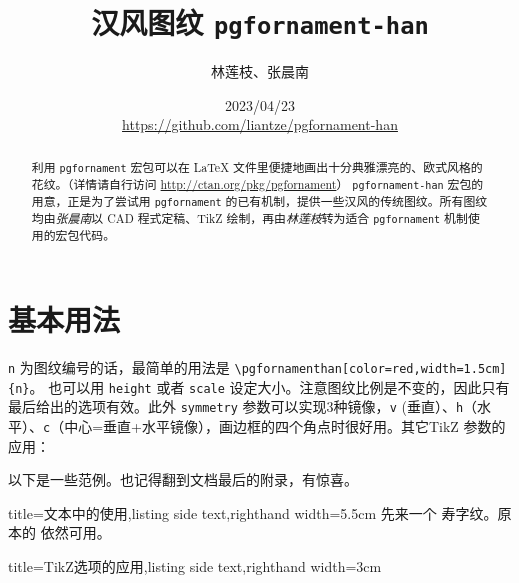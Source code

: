 \documentclass[fontset=fandol]{ctexart}
\title{汉风图纹 \texttt{pgfornament-han}}
\author{林莲枝、张晨南}
\date{2023/04/23\\\url{https://github.com/liantze/pgfornament-han}}
\newcommand{\latexinline}[1]{\lstinline|#1|}
\begin{document}
\maketitle

\begin{abstract}
利用 \texttt{pgfornament} 宏包可以在 \LaTeX{} 文件里便捷地画出十分典雅漂亮的、欧式风格的花纹。（详情请自行访问 \url{http://ctan.org/pkg/pgfornament}）
 \texttt{pgfornament-han} 宏包的用意，正是为了尝试用 \texttt{pgfornament} 的已有机制，提供一些汉风的传统图纹。所有图纹均由\emph{张晨南}以 CAD 程式定稿、TikZ 绘制，再由\emph{林莲枝}转为适合 \texttt{pgfornament} 机制使用的宏包代码。
\end{abstract}

\part{基本用法}

\texttt{n} 为图纹编号的话，最简单的用法是 \latexinline{\pgfornamenthan[color=red,width=1.5cm]{n}}。
也可以用 \texttt{height} 或者 \texttt{scale} 设定大小。注意图纹比例是不变的，因此只有最后给出的选项有效。此外 \texttt{symmetry} 参数可以实现3种镜像，\texttt{v} (垂直）、\texttt{h}（水平）、\texttt{c}（中心=垂直+水平镜像），画边框的四个角点时很好用。其它TikZ 参数的应用：

\begin{latexcode}
\end{latexcode}

以下是一些范例。也记得翻到文档最后的附录，有惊喜。

\bigskip

\begin{tcblisting}{title={文本中的使用},listing side text,righthand width=5.5cm}
先来一个 
寿字纹。原本的  依然可用。
\end{tcblisting}

\enlargethispage{\baselineskip}


\begin{tcblisting}{title={TikZ选项的应用},listing side text,righthand width=3cm}
\end{tcblisting}
\end{document}
